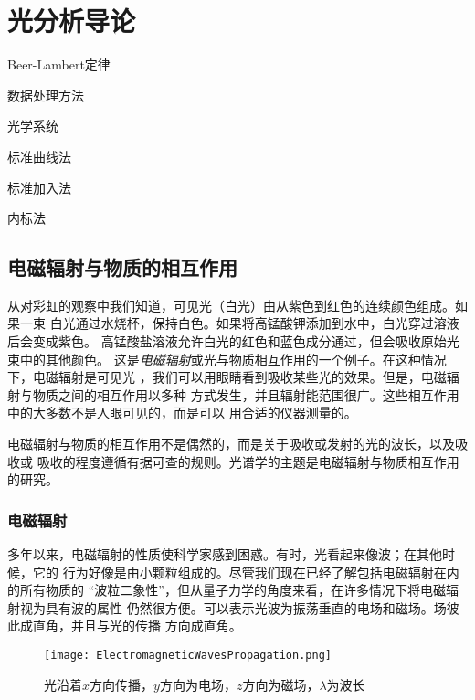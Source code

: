 \chapter{光分析导论}
\begin{introduction}[重点]
    \item Beer-Lambert定律
    \item 数据处理方法
    \item 光学系统
\end{introduction}
\begin{introduction}[难点]
    \item 标准曲线法
    \item 标准加入法
    \item 内标法

\end{introduction}
\section{电磁辐射与物质的相互作用}
从对彩虹的观察中我们知道，可见光（白光）由从紫色到红色的连续颜色组成。如果一束
白光通过水烧杯，保持白色。如果将高锰酸钾添加到水中，白光穿过溶液后会变成紫色。
高锰酸盐溶液允许白光的红色和蓝色成分通过，但会吸收原始光束中的其他颜色。
这是\emph{电磁辐射}或光与物质相互作用的一个例子。在这种情况下，电磁辐射是可见光
，我们可以用眼睛看到吸收某些光的效果。但是，电磁辐射与物质之间的相互作用以多种
方式发生，并且辐射能范围很广。这些相互作用中的大多数不是人眼可见的，而是可以
用合适的仪器测量的。

电磁辐射与物质的相互作用不是偶然的，而是关于吸收或发射的光的波长，以及吸收或
吸收的程度遵循有据可查的规则。光谱学的主题是电磁辐射与物质相互作用的研究。

\subsection{电磁辐射}
多年以来，电磁辐射的性质使科学家感到困惑。有时，光看起来像波；在其他时候，它的
行为好像是由小颗粒组成的。尽管我们现在已经了解包括电磁辐射在内的所有物质的
“波粒二象性”，但从量子力学的角度来看，在许多情况下将电磁辐射视为具有波的属性
仍然很方便。可以表示光波为振荡垂直的电场和磁场。场彼此成直角，并且与光的传播
方向成直角。
\begin{figure}[htbp]
    \centering
    \texttt{[image: ElectromagneticWavesPropagation.png]}
    \caption{光沿着$x$方向传播，$y$方向为电场，$z$方向为磁场，$\lambda$为波长}
    \label{fig:EMwave}
\end{figure}

